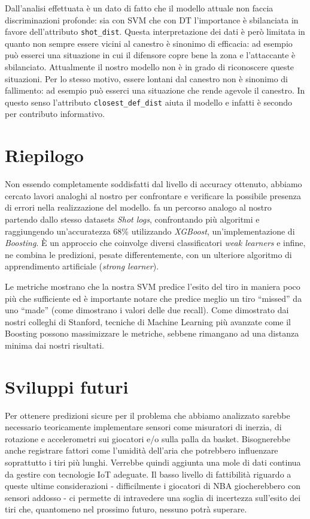 Dall'analisi effettuata è un dato di fatto che il modello attuale non faccia discriminazioni profonde: sia con SVM che con DT l'importance è sbilanciata in favore dell'attributo \texttt{shot\_dist}. 
Questa interpretazione dei dati è però limitata in quanto non sempre essere vicini al canestro è sinonimo di efficacia: ad esempio può esserci una situazione in cui il difensore copre bene la zona e l'attaccante è sbilanciato. Attualmente il nostro modello non è in grado di riconoscere queste situazioni. Per lo stesso motivo, essere lontani dal canestro non è sinonimo di fallimento: ad esempio può esserci una situazione che rende agevole il canestro.
In questo senso l'attributo \texttt{closest\_def\_dist} aiuta il modello e infatti è secondo per contributo informativo.

\section{Riepilogo}

\par
Non essendo completamente soddisfatti dal livello di accuracy ottenuto, abbiamo cercato lavori analoghi al nostro per confrontare e verificare la possibile presenza di errori nella realizzazione del modello. \cite{predictingNBAst} fa un percorso analogo al nostro partendo dallo stesso datasets \textit{Shot logs}, confrontando più algoritmi e raggiungendo un'accuratezza  68\% utilizzando \textit{XGBoost}, un'implementazione di \textit{Boosting}. È un approccio che coinvolge diversi classificatori \textit{weak learners} e infine, ne combina le predizioni, pesate differentemente, con un ulteriore algoritmo di apprendimento artificiale (\textit{strong learner}).

Le metriche mostrano che la nostra SVM predice l'esito del tiro in maniera poco più che sufficiente ed è importante notare che predice meglio un tiro “missed” da uno “made” (come dimostrano i valori delle due recall).
Come dimostrato dai nostri colleghi di Stanford, tecniche di Machine Learning più avanzate come il Boosting possono massimizzare le metriche, sebbene rimangano ad una distanza minima dai nostri risultati.

\section{Sviluppi futuri}
Per ottenere predizioni sicure per il problema che abbiamo analizzato sarebbe necessario teoricamente implementare sensori come misuratori di inerzia, di rotazione e accelerometri sui giocatori e/o sulla palla da basket. Bisognerebbe anche registrare fattori come l'umidità dell'aria che potrebbero influenzare soprattutto i tiri più lunghi. Verrebbe quindi aggiunta una mole di dati continua da gestire con tecnologie IoT adeguate. Il basso livello di fattibilità riguardo a queste ultime considerazioni - difficilmente i giocatori di NBA giocherebbero con sensori addosso - ci permette di intravedere una soglia di incertezza sull'esito dei tiri che, quantomeno nel prossimo futuro, nessuno potrà superare.

